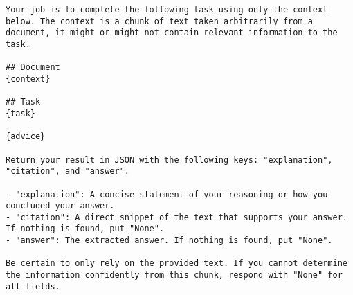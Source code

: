 \begin{tcolorbox}[colback=gray!10,  width=\textwidth]
\begin{lstlisting}[breaklines]
Your job is to complete the following task using only the context below. The context is a chunk of text taken arbitrarily from a document, it might or might not contain relevant information to the task.

## Document
{context}

## Task
{task}

{advice}

Return your result in JSON with the following keys: "explanation", "citation", and "answer".

- "explanation": A concise statement of your reasoning or how you concluded your answer.
- "citation": A direct snippet of the text that supports your answer. If nothing is found, put "None".
- "answer": The extracted answer. If nothing is found, put "None".

Be certain to only rely on the provided text. If you cannot determine the information confidently from this chunk, respond with "None" for all fields.
\end{lstlisting}
\end{tcolorbox}


